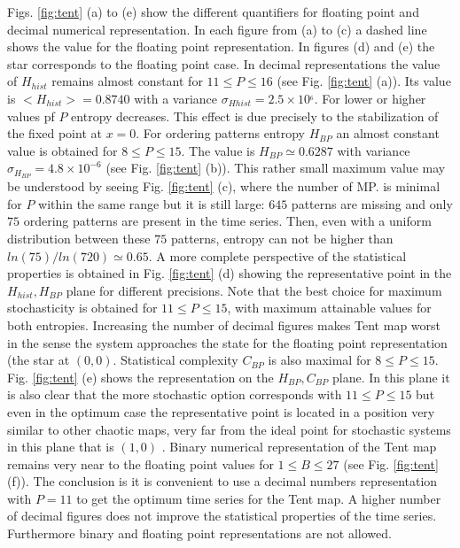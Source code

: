 Figs. \ref{fig:tent} (a) to (e) show the different quantifiers for floating point and decimal numerical representation. In each figure from (a) to (c) a dashed line shows the value for the floating point representation. In figures (d) and (e) the star corresponds to the floating point case. In decimal representations the value of $H_{hist}$ remains almost constant for $11\leq P\leq 16$ (see Fig. \ref{fig:tent} (a)). Its value is $<H_{hist}>=0.8740$ with a variance $\sigma_{Hhist}=2.5 \times 10^{_6}$. For lower or higher values pf $P$ entropy decreases. This effect is due precisely to the stabilization of the fixed point at $x=0$. For ordering patterns entropy $H_{BP}$ an almost constant value is obtained for $8\leq P \leq 15$. The value is  $H_{BP}\simeq 0.6287$ with variance $\sigma_{H_{BP}}=4.8 \times 10^{-6}$ (see Fig. \ref{fig:tent} (b)). This rather small maximum value may be understood by seeing  Fig. \ref{fig:tent} (c), where the number of MP.
% 
is minimal for $P$ within the same range but it is still large: $645$ patterns are missing and only $75$ ordering patterns are present in the time series. Then, even with a uniform distribution between these $75$ patterns, entropy can not be higher than $ln(75)/ln(720)\simeq 0.65$. 
A more complete perspective of the statistical properties is obtained in Fig. \ref{fig:tent} (d) showing the representative point in the $H_{hist},H_{BP}$ plane for different precisions. Note that the best choice for maximum stochasticity is obtained for $11\leq P \leq 15$, with maximum attainable values for both entropies.
Increasing the number of decimal figures makes Tent map worst in the sense the system approaches the state for the floating point representation (the star at $(0,0)$. 
Statistical complexity $C_{BP}$ is also maximal for $8\leq P \leq 15$. 
Fig. \ref{fig:tent} (e) shows the representation on the $H_{BP},C_{BP}$ plane. In this plane it is also clear that the more stochastic option corresponds with  $11\leq P \leq 15$ but even in the optimum case the representative point is located in a position very similar to other chaotic maps, very far from the ideal point for stochastic systems in this plane that is $(1,0)$ \cite{Rosso2007C}.
Binary numerical representation of the Tent map remains very near to the floating point values for  $1 \leq B \leq 27 $ (see Fig. \ref{fig:tent} (f)).
The conclusion is it is convenient to use a decimal numbers representation with  $P=11$ to get the optimum time series for the Tent map. A higher number of decimal figures does not improve the statistical properties of the time series. Furthermore binary and floating point representations are not allowed. 


